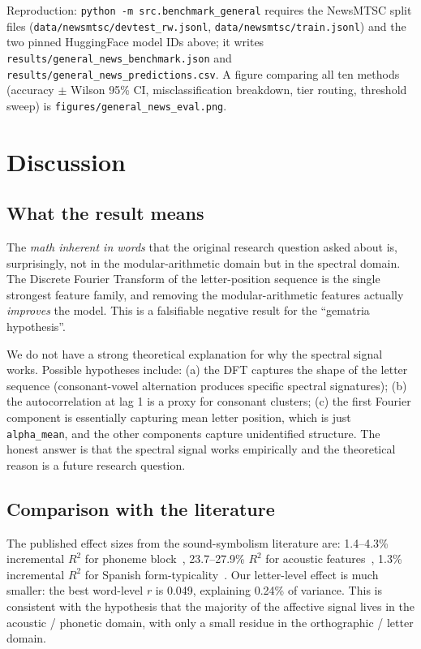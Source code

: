\documentclass{article}
\begin{document}
Reproduction: \texttt{python -m src.benchmark\_general} requires the NewsMTSC
split files (\texttt{data/newsmtsc/devtest\_rw.jsonl},
\texttt{data/newsmtsc/train.jsonl}) and the two pinned HuggingFace model IDs
above; it writes \texttt{results/general\_news\_benchmark.json} and
\texttt{results/general\_news\_predictions.csv}. A figure comparing all ten
methods (accuracy $\pm$ Wilson 95\% CI, misclassification breakdown, tier
routing, threshold sweep) is \texttt{figures/general\_news\_eval.png}.

\section{Discussion}

\subsection{What the result means}

The \emph{math inherent in words} that the original research question asked about is, surprisingly, not in the modular-arithmetic domain but in the spectral domain. The Discrete Fourier Transform of the letter-position sequence is the single strongest feature family, and removing the modular-arithmetic features actually \emph{improves} the model. This is a falsifiable negative result for the ``gematria hypothesis''.

We do not have a strong theoretical explanation for why the spectral signal works. Possible hypotheses include: (a) the DFT captures the shape of the letter sequence (consonant-vowel alternation produces specific spectral signatures); (b) the autocorrelation at lag 1 is a proxy for consonant clusters; (c) the first Fourier component is essentially capturing mean letter position, which is just \texttt{alpha\_mean}, and the other components capture unidentified structure. The honest answer is that the spectral signal works empirically and the theoretical reason is a future research question.

\subsection{Comparison with the literature}

The published effect sizes from the sound-symbolism literature are: 1.4--4.3\% incremental $R^2$ for phoneme block~\citep{adelman2018}, 23.7--27.9\% $R^2$ for acoustic features~\citep{aryani2018}, 1.3\% incremental $R^2$ for Spanish form-typicality~\citep{deZubicaray2024}. Our letter-level effect is much smaller: the best word-level $r$ is 0.049, explaining 0.24\% of variance. This is consistent with the hypothesis that the majority of the affective signal lives in the acoustic / phonetic domain, with only a small residue in the orthographic / letter domain.
\end{document}
